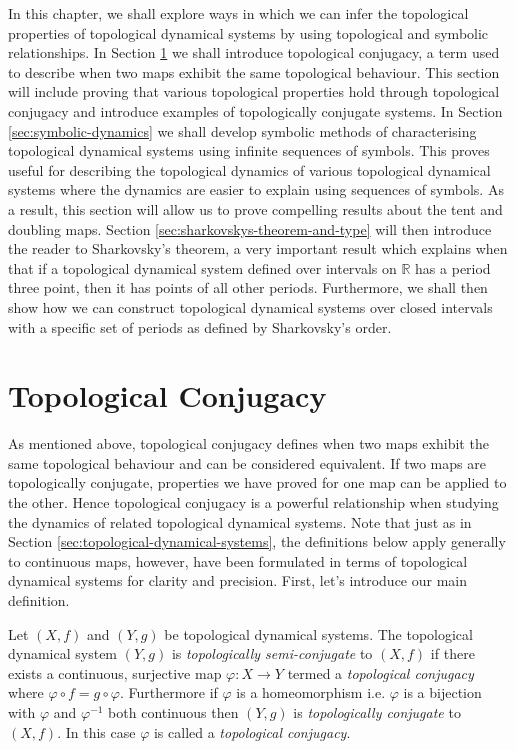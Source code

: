 In this chapter, we shall explore ways in which we can infer the topological properties of topological dynamical systems by using topological and symbolic relationships. In Section \ref{sec:topological-conjugacy} we shall introduce topological conjugacy, a term used to describe when two maps exhibit the same topological behaviour. This section will include proving that various topological properties hold through topological conjugacy and introduce examples of topologically conjugate systems. In Section \ref{sec:symbolic-dynamics} we shall develop symbolic methods of characterising topological dynamical systems using infinite sequences of symbols. This proves useful for describing the topological dynamics of various topological dynamical systems where the dynamics are easier to explain using sequences of symbols. As a result, this section will allow us to prove compelling results about the tent and doubling maps. Section \ref{sec:sharkovskys-theorem-and-type} will then introduce the reader to Sharkovsky's theorem, a very important result which explains when that if a topological dynamical system  defined over intervals on $\mathbb{R}$ has a period three point, then it has points of all other periods. Furthermore, we shall then show how we can construct topological dynamical systems over closed intervals with a specific set of periods as defined by Sharkovsky's order.

\section{Topological Conjugacy} \label{sec:topological-conjugacy}
As mentioned above, topological conjugacy defines when two maps exhibit the same topological behaviour and can be considered equivalent. If two maps are topologically conjugate, properties we have proved for one map can be applied to the other. Hence topological conjugacy is a powerful relationship when studying the dynamics of related topological dynamical systems. Note that just as in Section \ref{sec:topological-dynamical-systems}, the definitions below apply generally to continuous maps, however, have been formulated in terms of topological dynamical systems for clarity and precision. First, let's introduce our main definition.

\begin{defn} \label{defn:topological-conjugacy}
    Let $(X, f)$ and $(Y, g)$ be topological dynamical systems. The topological dynamical system $(Y, g)$ is \emph{topologically semi-conjugate} to $(X, f)$ if there exists a continuous, surjective map $\varphi: X \to Y$ termed a \emph{topological conjugacy} where $\varphi \circ f = g \circ \varphi$. Furthermore if $\varphi$ is a homeomorphism i.e. $\varphi$ is a bijection with $\varphi$ and $\varphi^{-1}$ both continuous then $(Y, g)$ is \emph{topologically conjugate} to $(X, f)$. In this case $\varphi$ is called a \emph{topological conjugacy}.
\end{defn}

